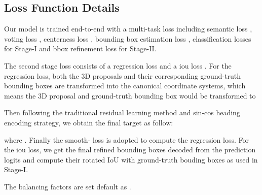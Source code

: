 \documentclass{article}
\begin{document}
\subsection{Loss Function Details}
\label{sec:loss}
Our model is trained end-to-end with a multi-task loss including semantic loss , voting loss , centerness loss , bounding box estimation loss , classification losses  for Stage-I and bbox refinement loss  for Stage-II.


The second stage loss  consists of a regression loss  and a iou loss . For the regression loss, both the 3D proposals and their corresponding ground-truth bounding boxes are transformed into the canonical coordinate systems, which means the 3D proposal  and ground-truth bounding box  would be transformed to 

Then following the traditional residual learning method and sin-cos heading encoding strategy, we obtain the final target  as follow:

where . Finally the smooth- loss is adopted to compute the regression loss. For the iou loss, we get the final refined bounding boxes decoded from the prediction logits and compute their rotated IoU with ground-truth bouding boxes as used in Stage-I. 

The balancing factors are set default as .
\end{document}
